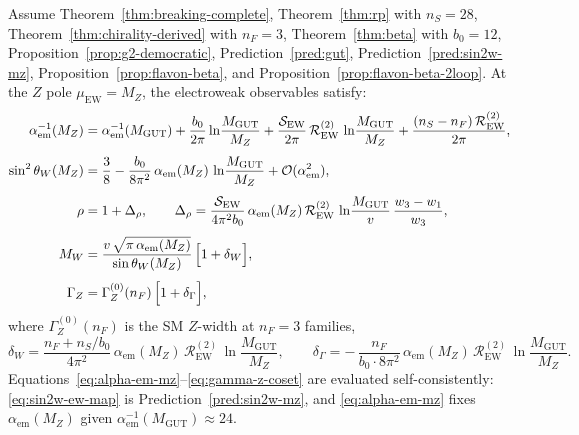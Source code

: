 \begin{theorem}
\label{thm:ew-radiative-complete}
Assume Theorem~\ref{thm:breaking-complete}, Theorem~\ref{thm:rp} with
$n_S=28$, Theorem~\ref{thm:chirality-derived} with $n_F=3$,
Theorem~\ref{thm:beta} with $b_0=12$, Proposition~\ref{prop:g2-democratic},
Prediction~\ref{pred:gut}, Prediction~\ref{pred:sin2w-mz},
Proposition~\ref{prop:flavon-beta}, and Proposition~\ref{prop:flavon-beta-2loop}.
At the $Z$ pole $\mu_{\mathrm{EW}}=M_Z$, the electroweak observables satisfy:
\begin{align}
  \alpha_{\mathrm{em}}^{-1}(M_Z)
  &=
  \alpha_{\mathrm{em}}^{-1}(M_{\mathrm{GUT}})
  + \frac{b_0}{2\pi}\ln\!\frac{M_{\mathrm{GUT}}}{M_Z}
  + \frac{\mathcal{S}_{\mathrm{EW}}}{2\pi}\,
    \mathcal{R}_{\mathrm{EW}}^{(2)}\,
    \ln\!\frac{M_{\mathrm{GUT}}}{M_Z}
  + \frac{(n_S-n_F)\,\mathcal{R}_{\mathrm{EW}}^{(2)}}{2\pi},
  \label{eq:alpha-em-mz}\\[4pt]
  \sin^2\theta_W(M_Z)
  &=
  \frac38
  - \frac{b_0}{8\pi^2}\,\alpha_{\mathrm{em}}(M_Z)\,
    \ln\!\frac{M_{\mathrm{GUT}}}{M_Z}
  + \mathcal{O}(\alpha_{\mathrm{em}}^2),
  \label{eq:sin2w-ew-map}\\[4pt]
  \rho
  &=
  1 + \Delta_\rho,
  \qquad
  \Delta_\rho
  =
  \frac{\mathcal{S}_{\mathrm{EW}}}{4\pi^2 b_0}\,
  \alpha_{\mathrm{em}}(M_Z)\,
  \mathcal{R}_{\mathrm{EW}}^{(2)}\,
  \ln\!\frac{M_{\mathrm{GUT}}}{v}\,
  \frac{w_3-w_1}{w_3},
  \label{eq:rho-coset}\\[4pt]
  M_W
  &=
  \frac{v\,\sqrt{\pi\,\alpha_{\mathrm{em}}(M_Z)}}{\sin\theta_W(M_Z)}\,
  \Bigl[1+\delta_W\Bigr],
  \label{eq:mw-coset}\\[4pt]
  \Gamma_Z
  &=
  \Gamma_Z^{(0)}(n_F)\,
  \Bigl[1+\delta_\Gamma\Bigr],
  \label{eq:gamma-z-coset}
\end{align}
where $\Gamma_Z^{(0)}(n_F)$ is the SM $Z$-width at $n_F=3$ families,
\begin{equation}\label{eq:mw-gamma-deltas}
  \delta_W
  =
  \frac{n_F+n_S/b_0}{4\pi^2}\,
  \alpha_{\mathrm{em}}(M_Z)\,
  \mathcal{R}_{\mathrm{EW}}^{(2)}\,
  \ln\!\frac{M_{\mathrm{GUT}}}{M_Z},
  \qquad
  \delta_\Gamma
  =
  -\,\frac{n_F}{b_0\cdot 8\pi^2}\,
  \alpha_{\mathrm{em}}(M_Z)\,
  \mathcal{R}_{\mathrm{EW}}^{(2)}\,
  \ln\!\frac{M_{\mathrm{GUT}}}{M_Z}.
\end{equation}
Equations~\eqref{eq:alpha-em-mz}--\eqref{eq:gamma-z-coset} are evaluated
self-consistently: \eqref{eq:sin2w-ew-map} is Prediction~\ref{pred:sin2w-mz},
and \eqref{eq:alpha-em-mz} fixes $\alpha_{\mathrm{em}}(M_Z)$ given
$\alpha_{\mathrm{em}}^{-1}(M_{\mathrm{GUT}})\approx24$.
\end{theorem}

